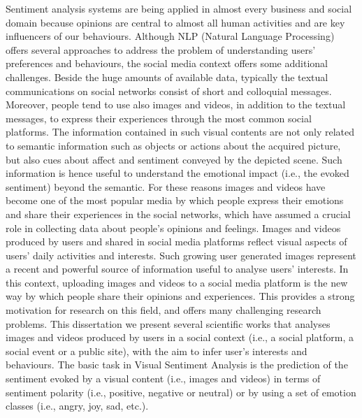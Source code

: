 Sentiment analysis systems are being applied in almost every business and social domain because opinions are central to almost all human activities and are key influencers of our behaviours. 
Although NLP (Natural Language Processing) offers several approaches to address the problem of understanding users' preferences and behaviours, the social media context offers some additional challenges. Beside the huge amounts of available data, typically the textual communications on social networks consist of short and colloquial messages. Moreover, people tend to use also images and videos, in addition to the textual messages, to express their experiences through the most common social platforms.
The information contained in such visual contents are not only related to semantic information such as objects or actions about the acquired picture, but also cues about affect and sentiment conveyed by the depicted scene. Such information is hence useful to understand the emotional impact (i.e., the evoked sentiment) beyond the semantic.
For these reasons images and videos have become one of the most popular media by which people express their emotions and share their experiences in the social networks, which have assumed a crucial role in collecting data about people's opinions and feelings. 
Images and videos produced by users and shared in social media platforms reflect visual aspects of users' daily activities and interests. Such growing user generated images represent a recent and powerful source of information useful to analyse users' interests. 
In this context, uploading images and videos to a social media platform is the new way by which people share their opinions and experiences.  
This provides a strong motivation for research on this field, and offers many challenging research problems.
This dissertation we present several scientific works that analyses images and videos produced by users in a social context (i.e., a social platform, a social event or a public site), with the aim to infer user's interests and behaviours.
The basic task in Visual Sentiment Analysis is the prediction of the sentiment evoked by a visual content (i.e., images and videos) in terms of sentiment polarity (i.e., positive, negative or neutral) or by using a set of emotion classes (i.e., angry, joy, sad, etc.).
